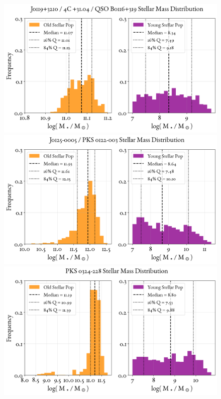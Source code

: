 \begin{figure}
    \centering
    \includegraphics[width=0.8\linewidth]{figures/ResultMasses/8_MassDistri_182.png}\\
    \includegraphics[width=0.8\linewidth]{figures/ResultMasses/9_MassDistri_201.png}\\
    \includegraphics[width=0.8\linewidth]{figures/ResultMasses/16_MassDistri_1070.png}    
\end{figure}
